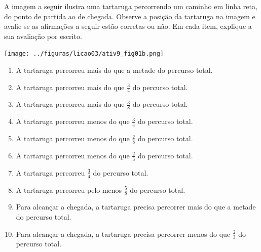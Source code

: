 \begin{atividade}{}

A imagem a seguir ilustra uma tartaruga percorrendo um caminho em linha reta, do ponto de partida ao de chegada. Observe a posição da tartaruga na imagem e avalie se as afirmações a seguir estão corretas ou não. Em cada item, explique a sua avaliação por escrito.

\noindent\texttt{[image: ../figuras/licao03/ativ9\_fig01b.png]}

\begin{enumerate} [\quad a)] %
  \item     A tartaruga percorreu mais do que a metade do percurso total.
  \item     A tartaruga percorreu mais do que     $\frac{3}{4}$     do percurso total.
  \item     A tartaruga percorreu mais do que     $\frac{3}{8}$     do percurso total.
  \item     A tartaruga percorreu menos do que     $\frac{3}{4}$     do percurso total.
  \item     A tartaruga percorreu menos do que     $\frac{2}{8}$     do percurso total.
  \item     A tartaruga percorreu menos do que     $\frac{2}{3}$     do percurso total.
  \item     A tartaruga percorreu     $\frac{3}{4}$     do percurso total.
  \item     A tartaruga percorreu pelo menos     $\frac{5}{8}$     do percurso total.
  \item     Para alcançar a chegada, a tartaruga precisa percorrer mais do que a metade do percurso total.
  \item     Para alcançar a chegada, a tartaruga precisa percorrer menos do que     $\frac{2}{3}$     do percurso total.
\end{enumerate} %

\end{atividade}

